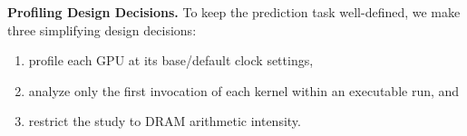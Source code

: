 \textbf{Profiling Design Decisions.}
To keep the prediction task well-defined, we make three simplifying design decisions:
\begin{enumerate}[label=(\textbf{\arabic*})]
    \item profile each GPU at its base/default clock settings,
    \item analyze only the first invocation of each kernel within an executable run, and
    \item restrict the study to DRAM arithmetic intensity.
\end{enumerate}
